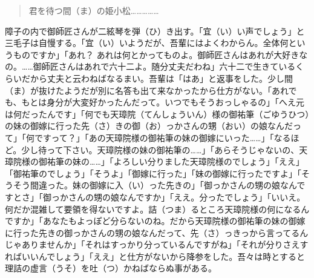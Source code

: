 \documentclass{book}
\begin{document}
\blockquote{君を待つ間（ま）の姫小松\ldots{}\ldots{}\ldots{}\ldots{}\ldots{}}
障子の内で御師匠さんが二絃琴を弾（ひ）き出す。「宜（い）い声でしょう」と三毛子は自慢する。「宜（い）いようだが、吾輩にはよくわからん。全体何というものですか」「あれ？ あれは何とかってものよ。御師匠さんはあれが大好きなの。\ldots{}\ldots{}御師匠さんはあれで六十二よ。随分丈夫だわね」六十二で生きているくらいだから丈夫と云わねばなるまい。吾輩は「はあ」と返事をした。少し間（ま）が抜けたようだが別に名答も出て来なかったから仕方がない。「あれでも、もとは身分が大変好かったんだって。いつでもそうおっしゃるの」「へえ元は何だったんです」「何でも天璋院（てんしょういん）様の御祐筆（ごゆうひつ）の妹の御嫁に行った先（さ）きの御（お）っかさんの甥（おい）の娘なんだって」「何ですって？」「あの天璋院様の御祐筆の妹の御嫁にいった\ldots{}\ldots{}」「なるほど。少し待って下さい。天璋院様の妹の御祐筆の\ldots{}\ldots{}」「あらそうじゃないの、天璋院様の御祐筆の妹の\ldots{}\ldots{}」「よろしい分りました天璋院様のでしょう」「ええ」「御祐筆のでしょう」「そうよ」「御嫁に行った」「妹の御嫁に行ったですよ」「そうそう間違った。妹の御嫁に入（い）った先きの」「御っかさんの甥の娘なんですとさ」「御っかさんの甥の娘なんですか」「ええ。分ったでしょう」「いいえ。何だか混雑して要領を得ないですよ。詰（つま）るところ天璋院様の何になるんですか」「あなたもよっぽど分らないのね。だから天璋院様の御祐筆の妹の御嫁に行った先きの御っかさんの甥の娘なんだって、先（さ）っきっから言ってるんじゃありませんか」「それはすっかり分っているんですがね」「それが分りさえすればいいんでしょう」「ええ」と仕方がないから降参をした。吾々は時とすると理詰の虚言（うそ）を吐（つ）かねばならぬ事がある。
\end{document}
